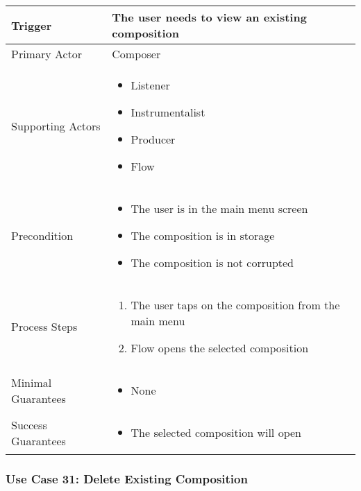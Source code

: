 \begin{tabularx}{\textwidth}{|X|X|}
\hline
Trigger & 
The user needs to view an existing composition \\
\hline
Primary Actor & 
Composer \\
\hline
Supporting Actors & 
\begin{itemize}
\item Listener
\item Instrumentalist
\item Producer
\item Flow
\end{itemize} \\
\hline
Precondition & 
\begin{itemize}
\item The user is in the main menu screen
\item The composition is in storage
\item The composition is not corrupted
\end{itemize} \\
\hline
Process Steps & 
\begin{enumerate}
\item The user taps on the composition from the main menu
\item Flow opens the selected composition
\end{enumerate} \\
\hline
Minimal Guarantees & 
\begin{itemize}
  \item None
\end{itemize} \\
\hline
Success Guarantees & 
\begin{itemize}
  \item The selected composition will open
\end{itemize} \\
\hline
\end{tabularx}

\subsubsection{Use Case 31: Delete Existing Composition}

